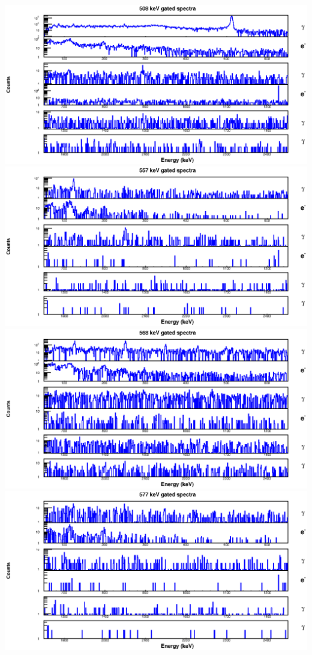 \begin{landscape}
\includegraphics[scale=1.2]{154Gd_Appendix/508_combined.eps}
\includegraphics[scale=1.2]{154Gd_Appendix/557_combined.eps}
\includegraphics[scale=1.2]{154Gd_Appendix/568_combined.eps}
\includegraphics[scale=1.2]{154Gd_Appendix/577_combined.eps}

\end{landscape}
